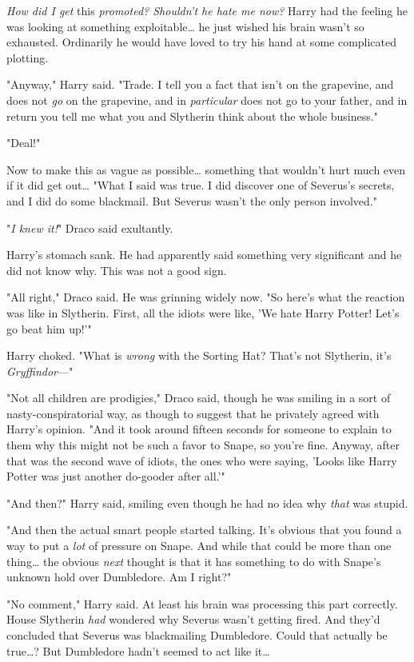 \emph{How did I get} this\emph{ promoted? Shouldn't he hate me now?} Harry had the feeling he was looking at something exploitable{\ldots} he just wished his brain wasn't so exhausted. Ordinarily he would have loved to try his hand at some complicated plotting.

"Anyway," Harry said. "Trade. I tell you a fact that isn't on the grapevine, and does not \emph{go} on the grapevine, and in \emph{particular} does not go to your father, and in return you tell me what you and Slytherin think about the whole business."

"Deal!"

Now to make this as vague as possible{\ldots} something that wouldn't hurt much even if it did get out{\ldots} "What I said was true. I did discover one of Severus's secrets, and I did do some blackmail. But Severus wasn't the only person involved."

"\emph{I knew it!}" Draco said exultantly.

Harry's stomach sank. He had apparently said something very significant and he did not know why. This was not a good sign.

"All right," Draco said. He was grinning widely now. "So here's what the reaction was like in Slytherin. First, all the idiots were like, 'We hate Harry Potter! Let's go beat him up!'"

Harry choked. "What is \emph{wrong} with the Sorting Hat? That's not Slytherin, it's \emph{Gryffindor}---"

"Not all children are prodigies," Draco said, though he was smiling in a sort of nasty-conspiratorial way, as though to suggest that he privately agreed with Harry's opinion. "And it took around fifteen seconds for someone to explain to them why this might not be such a favor to Snape, so you're fine. Anyway, after that was the second wave of idiots, the ones who were saying, 'Looks like Harry Potter was just another do-gooder after all.'"

"And then?" Harry said, smiling even though he had no idea why \emph{that} was stupid.

"And then the actual smart people started talking. It's obvious that you found a way to put a \emph{lot} of pressure on Snape. And while that could be more than one thing{\ldots} the obvious \emph{next} thought is that it has something to do with Snape's unknown hold over Dumbledore. Am I right?"

"No comment," Harry said. At least his brain was processing this part correctly. House Slytherin \emph{had} wondered why Severus wasn't getting fired. And they'd concluded that Severus was blackmailing Dumbledore. Could that actually be true{\ldots}? But Dumbledore hadn't seemed to act like it{\ldots}

